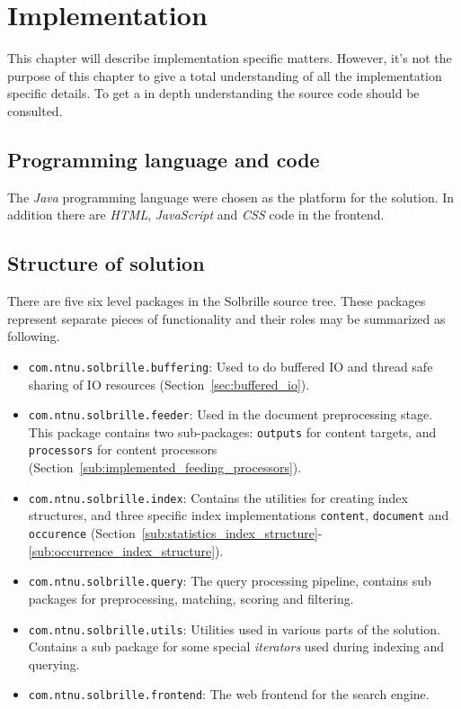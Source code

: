 \chapter{Implementation}\label{sec:implementation}
\thispagestyle{fancy}

This chapter will describe implementation specific matters. However, it's not the purpose of this chapter to give a total understanding of all the implementation specific details. To get a in depth understanding the source code should be consulted. 

\section{Programming language and code}\label{sec:programming_language_and_code}
The \emph{Java} programming language were chosen as the platform for the solution. In addition there are \emph{HTML}, \emph{JavaScript} and \emph{CSS} code in the frontend. 

\section{Structure of solution}\label{sec:structure_of_solution}
There are five six level packages in the Solbrille source tree. These packages represent separate pieces of functionality and their roles may be summarized as following.

\begin{itemize}
	\item \texttt{com.ntnu.solbrille.buffering}: Used to do buffered IO and thread safe sharing of IO resources (Section~\ref{sec:buffered_io}).
	\item \texttt{com.ntnu.solbrille.feeder}: Used in the document preprocessing stage. This package contains two sub-packages: \texttt{outputs} for content targets, and \texttt{processors} for content processors (Section~\ref{sub:implemented_feeding_processors}).
	\item \texttt{com.ntnu.solbrille.index}: Contains the utilities for creating index structures, and three specific index implementations \texttt{content}, \texttt{document} and \texttt{occurence} (Section~\ref{sub:statistics_index_structure}-\ref{sub:occurrence_index_structure}). 
	\item \texttt{com.ntnu.solbrille.query}: The query processing pipeline, contains sub packages for preprocessing, matching, scoring and filtering. 
	\item \texttt{com.ntnu.solbrille.utils}: Utilities used in various parts of the solution. Contains a sub package for some special \emph{iterators} used during indexing and querying. 
	\item \texttt{com.ntnu.solbrille.frontend}: The web frontend for the search engine.
\end{itemize}

